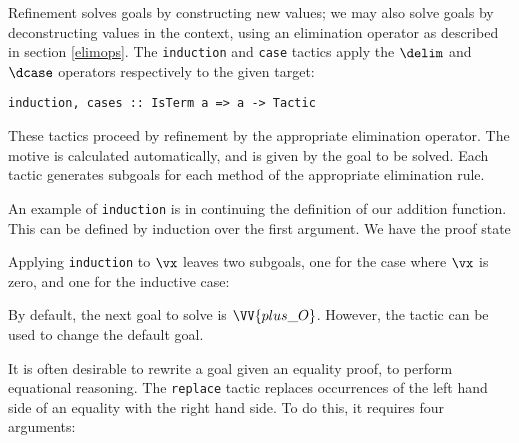 Refinement solves goals by constructing new values; we may also solve
goals by deconstructing values in the context, using an elimination
operator as described in section \ref{elimops}. The \texttt{induction}
and \texttt{case} tactics apply the $\delim$ and $\dcase$ operators
respectively to the given target:

\verb+induction, cases :: IsTerm a => a -> Tactic+

These tactics proceed by refinement by the appropriate elimination
operator. The motive is calculated automatically, and is given by the
goal to be solved. Each tactic generates subgoals for each method of
the appropriate elimination rule.




An example of \texttt{induction} is in continuing the definition of
our addition function. This can be defined by induction over the first
argument. We have the proof state


Applying \texttt{induction} to $\vx$ leaves two subgoals, one for the
case where $\vx$ is zero, and one for the inductive case:


By default, the next goal to solve is $\VV{plus\_O}$. However, the
 tactic can be used to change the default goal.

It is often desirable to rewrite a goal given an equality proof, to
perform equational reasoning. The \texttt{replace} tactic replaces
occurrences of the left hand side of an equality with the right hand
side. To do this, it requires four arguments:

